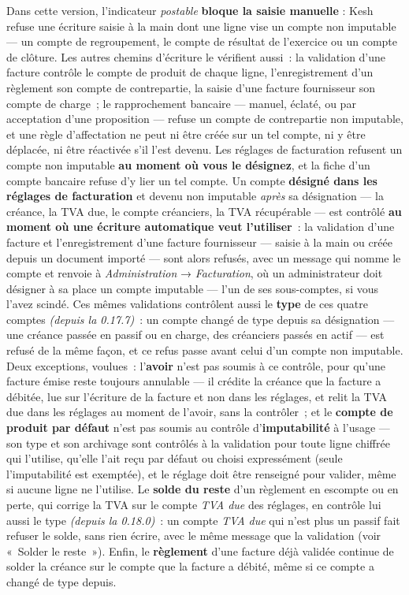 \documentclass[a4paper,11pt,oneside]{article}
\begin{document}
\begin{keshnote}
Dans cette version, l'indicateur \emph{postable} \textbf{bloque la saisie manuelle} : Kesh refuse une écriture saisie à la main dont une ligne vise un compte non imputable — un compte de regroupement, le compte de résultat de l'exercice ou un compte de clôture. Les autres chemins d'écriture le vérifient aussi~: la validation d'une facture contrôle le compte de produit de chaque ligne, l'enregistrement d'un règlement son compte de contrepartie, la saisie d'une facture fournisseur son compte de charge~; le rapprochement bancaire — manuel, éclaté, ou par acceptation d'une proposition — refuse un compte de contrepartie non imputable, et une règle d'affectation ne peut ni être créée sur un tel compte, ni y être déplacée, ni être réactivée s'il l'est devenu. Les réglages de facturation refusent un compte non imputable \textbf{au moment où vous le désignez}, et la fiche d'un compte bancaire refuse d'y lier un tel compte. Un compte \textbf{désigné dans les réglages de facturation} et devenu non imputable \emph{après} sa désignation --- la créance, la TVA due, le compte créanciers, la TVA récupérable --- est contrôlé \textbf{au moment où une écriture automatique veut l'utiliser}~: la validation d'une facture et l'enregistrement d'une facture fournisseur --- saisie à la main ou créée depuis un document importé --- sont alors refusés, avec un message qui nomme le compte et renvoie à \emph{Administration} → \emph{Facturation}, où un administrateur doit désigner à sa place un compte imputable --- l'un de ses sous-comptes, si vous l'avez scindé. Ces mêmes validations contrôlent aussi le \textbf{type} de ces quatre comptes \emph{(depuis la 0.17.7)}~: un compte changé de type depuis sa désignation --- une créance passée en passif ou en charge, des créanciers passés en actif --- est refusé de la même façon, et ce refus passe avant celui d'un compte non imputable. Deux exceptions, voulues~: l'\textbf{avoir} n'est pas soumis à ce contrôle, pour qu'une facture émise reste toujours annulable --- il crédite la créance que la facture a débitée, lue sur l'écriture de la facture et non dans les réglages, et relit la TVA due dans les réglages au moment de l'avoir, sans la contrôler~; et le \textbf{compte de produit par défaut} n'est pas soumis au contrôle d'\textbf{imputabilité} à l'usage --- son type et son archivage sont contrôlés à la validation pour toute ligne chiffrée qui l'utilise, qu'elle l'ait reçu par défaut ou choisi expressément (seule l'imputabilité est exemptée), et le réglage doit être renseigné pour valider, même si aucune ligne ne l'utilise. Le \textbf{solde du reste} d'un règlement en escompte ou en perte, qui corrige la TVA sur le compte \emph{TVA due} des réglages, en contrôle lui aussi le type \emph{(depuis la 0.18.0)}~: un compte \emph{TVA due} qui n'est plus un passif fait refuser le solde, sans rien écrire, avec le même message que la validation (voir «~Solder le reste~»). Enfin, le \textbf{règlement} d'une facture déjà validée continue de solder la créance sur le compte que la facture a débité, même si ce compte a changé de type depuis.


\end{keshnote}
\end{document}
